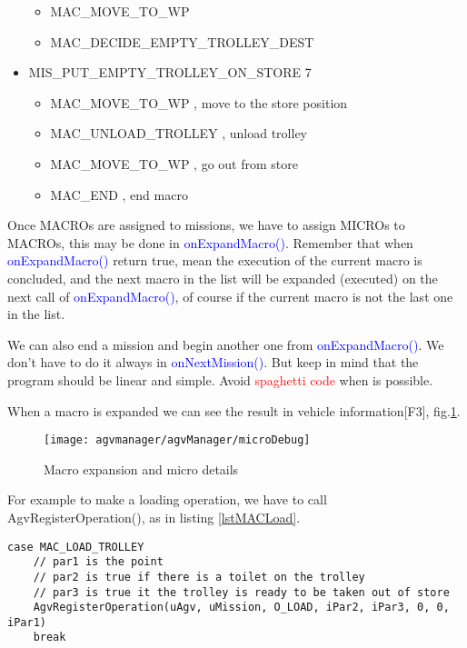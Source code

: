 \begin{itemize}
\begin{itemize}
		\item MAC\_MOVE\_TO\_WP
		\item MAC\_DECIDE\_EMPTY\_TROLLEY\_DEST
	\end{itemize}
\item MIS\_PUT\_EMPTY\_TROLLEY\_ON\_STORE 7
	\begin{itemize}
		\item MAC\_MOVE\_TO\_WP , move to the store position
		\item MAC\_UNLOAD\_TROLLEY , unload trolley
		\item MAC\_MOVE\_TO\_WP , go out from store
		\item MAC\_END , end macro
	\end{itemize}
\end{itemize}

Once MACROs are assigned to missions, we have to assign MICROs to MACROs, this may be done in \textcolor{blue}{onExpandMacro()}. Remember that when \textcolor{blue}{onExpandMacro()} return true, mean the execution of the current macro is concluded, and the next macro in the list will be expanded (executed) on the next call of \textcolor{blue}{onExpandMacro()}, of course if the current macro is not the last one in the list.

We can also end a mission and begin another one from \textcolor{blue}{onExpandMacro()}. We don't have to do it always in \textcolor{blue}{onNextMission()}. But keep in mind that the program should be linear and simple. Avoid \textcolor{red}{spaghetti code} when is possible.

When a macro is expanded we can see the result in vehicle information[F3], fig.\ref{figmacroexp}.

\begin{figure}
	\centering\texttt{[image: agvmanager/agvManager/microDebug]}
	\caption{Macro expansion and micro details}
	\label{figmacroexp}
\end{figure}

For example to make a loading operation, we have to call AgvRegisterOperation(), as in listing \ref{lstMACLoad}.

\begin{lstlisting}[caption= Loading MACRO, label=lstMACLoad]
case MAC_LOAD_TROLLEY
	// par1 is the point
	// par2 is true if there is a toilet on the trolley
	// par3 is true it the trolley is ready to be taken out of store
	AgvRegisterOperation(uAgv, uMission, O_LOAD, iPar2, iPar3, 0, 0, iPar1)
	break

\end{lstlisting}

